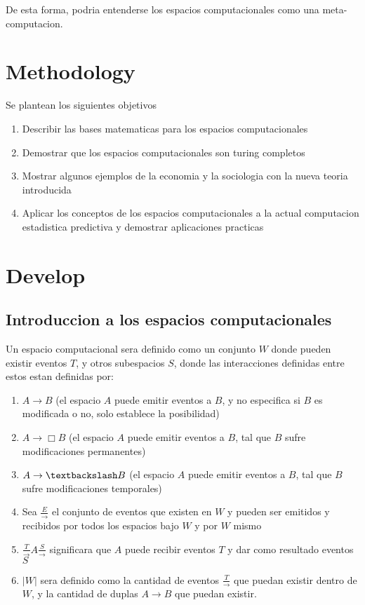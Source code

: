 \documentclass[12pt]{book}
\begin{document}
De esta forma, podria entenderse los espacios computacionales como una meta-computacion.

\chapter{Methodology}

Se plantean los siguientes objetivos

\begin{enumerate}
    \item Describir las bases matematicas para los espacios computacionales
    \item Demostrar que los espacios computacionales son turing completos
    \item Mostrar algunos ejemplos de la economia y la sociologia con la nueva teoria introducida
    \item Aplicar los conceptos de los espacios computacionales a la actual computacion estadistica predictiva y demostrar aplicaciones practicas
\end{enumerate}

\chapter{Develop}
\section{Introduccion a los espacios computacionales}

Un espacio computacional sera definido como un conjunto $W$ donde pueden existir eventos $T$, y otros subespacios $S$, donde las
interacciones definidas entre estos estan definidas por: 

\begin{enumerate}
    \item $A \rightarrow B$ (el espacio $A$ puede emitir eventos a $B$, y no especifica si $B$ es modificada o no, solo establece la posibilidad)
    \item $A \rightarrow \Box B$ (el espacio $A$ puede emitir eventos a $B$, tal que $B$ sufre modificaciones permanentes)
    \item $A \rightarrow \textbackslash B$ (el espacio $A$ puede emitir eventos a $B$, tal que $B$ sufre modificaciones temporales)
    \item Sea $\frac{E}{\rightarrow}$ el conjunto de eventos que existen en $W$ y pueden ser emitidos y recibidos por todos los espacios bajo $W$ y por $W$ mismo
    \item $\frac{T}{\rightarrow} A \frac{S}{\rightarrow}$ significara que $A$ puede recibir eventos $T$ y dar como resultado eventos $S$
    \item $|W|$ sera definido como la cantidad de eventos $\frac{T}{\rightarrow}$ que puedan existir dentro de $W$, y la cantidad de duplas $A \rightarrow B$ que puedan existir.
\end{enumerate}
\end{document}
